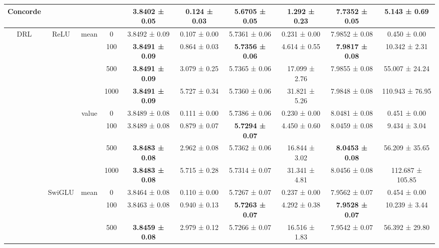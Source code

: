 \documentclass{article}
\begin{document}
\begin{table}[htbp]
{\begin{tabular}{c|c|c|c|c|c|c|c|c|c}
\cmidrule{1-1}\cmidrule{5-10}    Concorde & \multicolumn{3}{c|}{}    & \multicolumn{1}{c|}{3.8402 ± 0.05} & \multicolumn{1}{c|}{0.124 ± 0.03} & \multicolumn{1}{c|}{5.6705 ± 0.05} & \multicolumn{1}{c|}{1.292 ± 0.23} & \multicolumn{1}{c|}{7.7352 ± 0.05} & \multicolumn{1}{c}{5.143 ± 0.69} \\
    \midrule
    \midrule
    \multicolumn{1}{c|}{\multirow{16}[8]{*}{DRL}} & \multicolumn{1}{c|}{\multirow{8}[4]{*}{ReLU}} & \multicolumn{1}{c|}{\multirow{4}[2]{*}{mean}} & 0      & 3.8492 ± 0.09 & 0.107 ± 0.00 & 5.7361 ± 0.06 & 0.231 ± 0.00 & 7.9852 ± 0.08 & 0.450 ± 0.00 \\
           &        &        & 100    & \textbf{3.8491 ± 0.09} & 0.864 ± 0.03 & \textbf{5.7356 ± 0.06} & 4.614 ± 0.55 & \textbf{7.9817 ± 0.08} & 10.342 ± 2.31 \\
           &        &        & 500    & \textbf{3.8491 ± 0.09} & 3.079 ± 0.25 & 5.7365 ± 0.06 & 17.099 ± 2.76 & 7.9855 ± 0.08 & 55.007 ± 24.24 \\
           &        &        & 1000   & \textbf{3.8491 ± 0.09} & 5.727 ± 0.34 & 5.7360 ± 0.06 & 31.821 ± 5.26 & 7.9848 ± 0.08 & 110.943 ± 76.95 \\
\cmidrule{3-10}           &        & \multicolumn{1}{c|}{\multirow{4}[2]{*}{value}} & 0      & 3.8489 ± 0.08 & 0.111 ± 0.00 & 5.7386 ± 0.06 & 0.230 ± 0.00 & 8.0481 ± 0.08 & 0.451 ± 0.00 \\
           &        &        & 100    & 3.8489 ± 0.08 & 0.879 ± 0.07 & \textbf{5.7294 ± 0.07} & 4.450 ± 0.60 & 8.0459 ± 0.08 & 9.434 ± 3.04 \\
           &        &        & 500    & \textbf{3.8483 ± 0.08} & 2.962 ± 0.08 & 5.7362 ± 0.06 & 16.844 ± 3.02 & \textbf{8.0453 ± 0.08} & 56.209 ± 35.65 \\
           &        &        & 1000   & \textbf{3.8483 ± 0.08} & 5.715 ± 0.28 & 5.7314 ± 0.07 & 31.341 ± 4.81 & 8.0456 ± 0.08 & 112.687 ± 105.85 \\
\cmidrule{2-10}           & \multicolumn{1}{c|}{\multirow{8}[4]{*}{SwiGLU}} & \multicolumn{1}{c|}{\multirow{4}[2]{*}{mean}} & 0      & 3.8464 ± 0.08 & 0.110 ± 0.00 & 5.7267 ± 0.07 & 0.237 ± 0.00 & 7.9562 ± 0.07 & 0.454 ± 0.00 \\
           &        &        & 100    & 3.8463 ± 0.08 & 0.940 ± 0.13 & \textbf{5.7263 ± 0.07} & 4.292 ± 0.38 & \textbf{7.9528 ± 0.07} & 10.239 ± 3.44 \\
           &        &        & 500    & \textbf{3.8459 ± 0.08} & 2.979 ± 0.12 & 5.7266 ± 0.07 & 16.516 ± 1.83 & 7.9542 ± 0.07 & 56.392 ± 29.80 \\

\end{tabular}}
\end{table}
\end{document}
